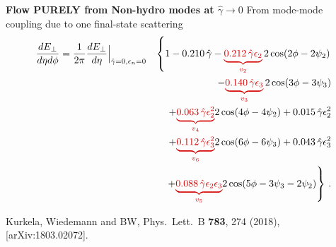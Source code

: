 \documentclass[9pt,a4paper,unknownkeysallowed,xcolor=dvipsnames,aspectratio=43]{beamer}
\begin{document}
\begin{frame}{\bf\huge Flow PURELY from Non-hydro modes at $\hat{\gamma}\to0$}
\vspace{4mm}
{{\LARGE From mode-mode coupling due to \color{darkred}  one final-state scattering}}
\vspace{2mm}
{
\begin{eqnarray}
 \frac{d E_\perp}{d \eta d \phi}
= \frac{1}{2\pi}\frac{d E_\perp}{d \eta}\Big\vert_{\hat\gamma=0,\epsilon_n =0} 
&&  \left\{
1 -0.210 \,\hat\gamma -{\color{darkred} \underbrace{0.212 \, \hat\gamma \epsilon_2}_{v_2}} \, 2 \cos(2 \phi - 2 \psi_2) \right.\nonumber \\
&& -{\color{darkred} \underbrace{ 0.140 \,\hat\gamma \epsilon_3}_{v_3}} \, 2 \cos(3\phi- 3\psi_3)\nonumber \\
&&+ {\color{darkred} \underbrace{0.063 \,\hat\gamma \epsilon_2^2}_{v_4}} 2 \cos(4 \phi - 4 \psi_2) +0.015\, \hat\gamma \epsilon_2^2\nonumber \\
&& +{\color{darkred} \underbrace{0.112\, \hat\gamma \epsilon_3^2}_{v_6}} 2 \cos(6 \phi - 6 \psi_3) + 0.043 \,\hat\gamma \epsilon_3^2 \nonumber \\
&&\left.+ {\color{darkred} \underbrace{0.088 \,\hat\gamma \epsilon_2 \epsilon_3}_{v_5}} 2 \cos(5\phi - 3\psi_3- 2\psi_2)
 \right\}\,\nonumber.
\end{eqnarray}
}
\vspace{1mm}
\begin{center}
{\tiny  {\color{teablue} Kurkela, Wiedemann and BW,
  Phys.\ Lett.\ B {\bf 783}, 274 (2018), [arXiv:1803.02072].
  }
  }
\end{center}
\end{frame}
%
%
\setcounter{page}{8}
\end{document}
